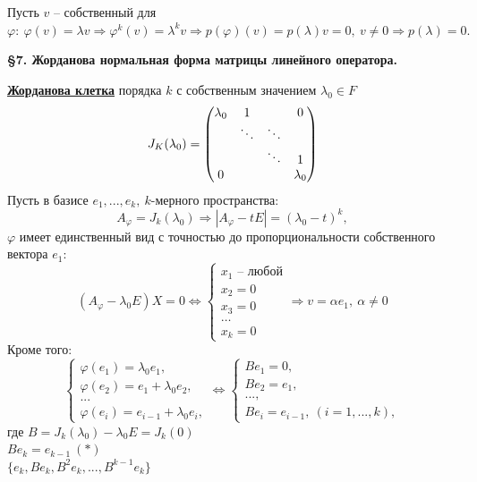 \documentclass[a4paper, 12pt]{article}
\theoremstyle{definition}
\begin{document}
    Пусть $v$ -- собственный для $\varphi:\ \varphi(v) = 
    \lambda v \Longrightarrow \varphi^k(v) = \lambda^kv
    \Longrightarrow p(\varphi)(v) = p(\lambda)v = 0,\ v \neq 0
    \Longrightarrow p(\lambda) = 0.$
    \newpage
    \begin{center}
        \begin{Large}
            \textbf{\S 7. Жорданова нормальная форма матрицы
            линейного оператора.} 
        \end{Large}
    \end{center}
    \underline{\textbf{Жорданова клетка}} порядка $k$ с собственным
    значением $\lambda_0 \in F$
    $$J_K(\lambda_0) = 
    \begin{pmatrix}
        \lambda_0 & 1 & \null & 0\\
        \null & \ddots & \ddots & \null\\
        \null & \null & \ddots & 1\\
        0 & \null & \null & \lambda_0
    \end{pmatrix}
    $$
    Пусть в базисе $e_1,...,e_k,\ k$-мерного пространства:
    $$A_\varphi  =J_k(\lambda_0) \Longrightarrow |A_\varphi
    - t E| = (\lambda_0 - t)^k,$$ $\varphi$ имеет 
    единственный вид с точностью до пропорциональности
    собственного вектора $e_1:$$$(A_\varphi - \lambda_0 E)X = 0
    \Longleftrightarrow 
    \begin{cases}
        x_1 \text{ -- любой}\\x_2 = 0\\x_3 = 0\\\dots\\x_k = 0
    \end{cases}  \Longrightarrow 
    v = \alpha e_1,\ \alpha \neq 0$$  
    Кроме того:
    $$\begin{cases}
        \varphi(e_1) = \lambda_0e_1,\\
        \varphi(e_2) = e_1 + \lambda_0e_2,\\...
        \\\varphi(e_i) = e_{i-1} + \lambda_0e_i,
    \end{cases} \Longleftrightarrow  
    \begin{cases}
        Be_1 = 0,\\ Be_2 = e_1,\\...,\\
    Be_i = e_{i-1},\ (i = 1,...,k),
    \end{cases}$$где $B = J_k(\lambda_0) - \lambda_0E = J_k(0)$ 
    \\$Be_k = e_{k-1}\ (*)$\\$\{e_k, Be_k, B^2e_k,...,B^{k-1}e_k\}$
\end{document}
